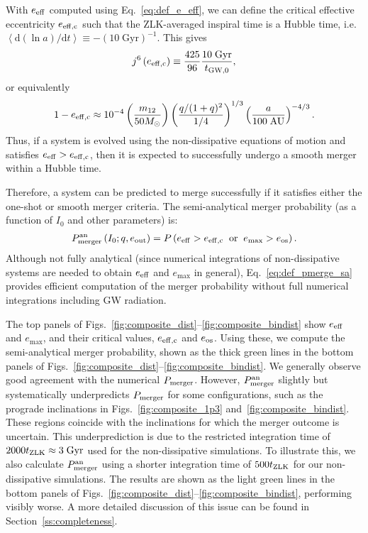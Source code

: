 \documentclass[
        fleqn,
        usenatbib,
    ]{mnras}
\newcommand*{\rdil}[2]{\mathrm{d}#1/\mathrm{d}#2}
\newcommand*{\ev}[1]{\left\langle#1\right\rangle}
\newcommand*{\p}[1]{\left(#1\right)}
\begin{document}
With $e_{\rm eff}$ computed using Eq.~\eqref{eq:def_e_eff}, we can define the
critical effective eccentricity $e_{\rm eff, c}$ such that the ZLK-averaged
inspiral time is a Hubble time, i.e.\ $\ev{\rdil{(\ln a)}{t}} \equiv
-\p{10\;\mathrm{Gyr}}^{-1}$. This gives
\begin{align}
    j^6\p{e_{\rm eff, c}} \equiv \frac{425}{96}\frac{10\;\mathrm{Gyr}}{t_{\rm
        GW, 0}}, \label{eq:def_e_eff_c}
\end{align}
or equivalently
\begin{align}
    1 - e_{\rm eff, c} \approx 10^{-4}
        \p{\frac{m_{12}}{50M_{\odot}}}
        \p{\frac{q / (1 + q)^2}{1/4}}^{1/3}
        \p{\frac{a}{100\;\mathrm{AU}}}^{-4/3}.
\end{align}
Thus, if a system is evolved using the non-dissipative equations of motion and
satisfies $e_{\rm eff} > e_{\rm eff, c}$, then it is expected to successfully
undergo a smooth merger within a Hubble time.

Therefore, a system can be predicted to merge successfully if it satisfies either
the one-shot or smooth merger criteria. The semi-analytical
merger probability (as a function of $I_0$ and other parameters) is:
\begin{align}
    P_{\rm merger}^{\rm an}\p{I_0; q, e_{\rm out}} =
        P\p{e_{\rm eff} > e_{\rm eff, c} \;\;\text{or}\;\;
        e_{\max} > e_{\rm os}}.\label{eq:def_pmerge_sa}
\end{align}
Although not fully analytical (since numerical integrations of non-dissipative
systems are needed to obtain $e_{\rm eff}$ and $e_{\max}$ in general),
Eq.~\eqref{eq:def_pmerge_sa} provides efficient computation of the merger
probability without full numerical integrations including GW radiation.

The top panels of Figs.~\ref{fig:composite_dist}--\ref{fig:composite_bindist}
show $e_{\rm eff}$ and $e_{\max}$, and their critical values, $e_{\rm eff, c}$
and $e_{\rm os}$. Using these, we compute the semi-analytical
merger probability, shown as the thick green lines in the bottom panels of
Figs.~\ref{fig:composite_dist}--\ref{fig:composite_bindist}. We generally
observe good agreement with the numerical $P_{\rm merger}$. However, $P_{\rm
merger}^{\rm an}$ slightly but systematically underpredicts $P_{\rm merger}$ for
some configurations, such as the prograde inclinations in
Figs.~\ref{fig:composite_1p3} and~\ref{fig:composite_bindist}. These regions
coincide with the inclinations for which the merger outcome is uncertain. This
underprediction is due to the restricted integration time of $2000 t_{\rm ZLK}
\approx 3\;\mathrm{Gyr}$ used for the non-dissipative simulations. To illustrate
this, we also calculate $P_{\rm merger}^{\rm an}$ using a shorter integration
time of $500 t_{\rm ZLK}$ for our non-dissipative simulations. The results are
shown as the light green lines in the bottom panels of
Figs.~\ref{fig:composite_dist}--\ref{fig:composite_bindist}, performing visibly
worse. A more detailed discussion of this issue can be found in
Section~\ref{ss:completeness}.
\end{document}
